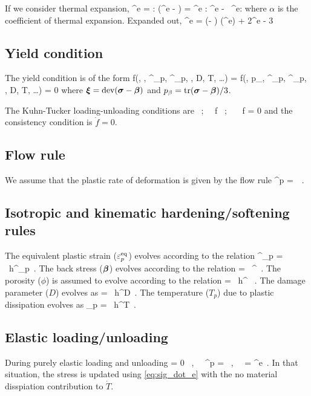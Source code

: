 If we consider thermal expansion,
\Beq
  \dot{\Bsig}^e =  : \left(\dot{\BVeps}^e - \alpha {}\BI\right)
                = \SfC^e : \dot{\BVeps}^e - \alpha {}\, \SfC^e:\BI
\Eeq
where $\alpha$ is the coefficient of thermal expansion.
Expanded out, 
\Beq \label{eq:sig_dot_e}
  \dot{\Bsig}^e = \left(\kappa - \mu\right) \Tr(\dot{\BVeps}^e) \BI + 2\mu\dot{\BVeps}^e 
                - 3\kappa\alpha{}\BI 
\Eeq

\subsection{Yield condition}
The yield condition is of the form
\Beq
  f(\Bsig, \Bbeta, \Veps^\Teq_p, \dot{\Veps}^\Teq_p, \phi, D, T, \dots) =
  f(\Bxi, p_\beta, \Veps^\Teq_p, \dot{\Veps}^\Teq_p, \phi, D, T, \dots) = 0
\Eeq
where $\boldsymbol{\xi} = \text{dev}(\boldsymbol{\sigma} - \boldsymbol{\beta})$ and $p_\beta = \text{tr}(\boldsymbol{\sigma} - \boldsymbol{\beta})/3$. 

The Kuhn-Tucker loading-unloading conditions are
\Beq
  \dot{\lambda}  ~;~~  f  ~;~~ \dot{\lambda}~f = 0
\Eeq
and the consistency condition is $\dot{f} = 0$.

\subsection{Flow rule}
We assume that the plastic rate of deformation is given by the flow rule
\Beq
  \dot{\BVeps}^p = \dot{\lambda}~\BM \,.
\Eeq

\subsection{Isotropic and kinematic hardening/softening rules}
The equivalent plastic strain ($\varepsilon_p^{\text{eq}}$) evolves according to the relation
\Beq
  \dot{\Veps}^\Teq_p = \dot{\lambda}~h^{\Veps_p} \,.
\Eeq
The back stress ($\boldsymbol{\beta}$) evolves according to the relation
\Beq
  \dot{\Bbeta} = \dot{\lambda}~\Bh^{\beta} \,.
\Eeq
The porosity ($\phi$) is assumed to evolve according to the relation
\Beq
  \dot{\phi} = \dot{\lambda}~h^{\phi} ~.
\Eeq
The damage parameter ($D$) evolves as
\Beq
   = \dot{\lambda}~h^D \,.
\Eeq
The temperature ($T_p$) due to plastic dissipation evolves as
\Beq
  _p = \dot{\lambda}~h^T \,.
\Eeq

\subsection{Elastic loading/unloading}
During purely elastic loading and unloading
\Beq
  \dot{\lambda} = 0 ~,~~ \dot{\BVeps}^p = \Bzero ~,~~ \dot{\BVeps} = \dot{\BVeps}^e \,.
\Eeq
In that situation, the stress is updated using \eqref{eq:sig_dot_e} with the no material
disspiation contribution to $\dot{T}$.

